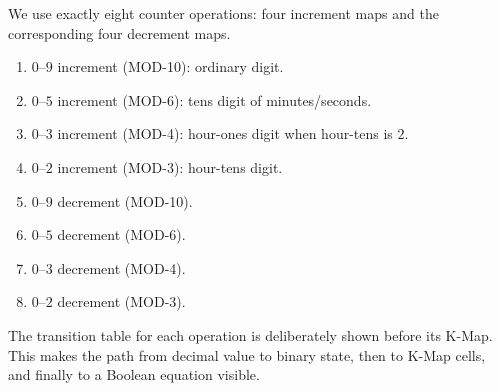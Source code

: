 \documentclass[12pt,letterpaper]{article}
\begin{document}
We use exactly eight counter operations: four increment maps and the
corresponding four decrement maps.

\begin{enumerate}
\item \(0\)--\(9\) increment (MOD-10): ordinary digit.
\item \(0\)--\(5\) increment (MOD-6): tens digit of minutes/seconds.
\item \(0\)--\(3\) increment (MOD-4): hour-ones digit when hour-tens is \(2\).
\item \(0\)--\(2\) increment (MOD-3): hour-tens digit.
\item \(0\)--\(9\) decrement (MOD-10).
\item \(0\)--\(5\) decrement (MOD-6).
\item \(0\)--\(3\) decrement (MOD-4).
\item \(0\)--\(2\) decrement (MOD-3).
\end{enumerate}

The transition table for each operation is deliberately shown before its
K-Map. This makes the path from decimal value to binary state, then to
K-Map cells, and finally to a Boolean equation visible.
\end{document}
